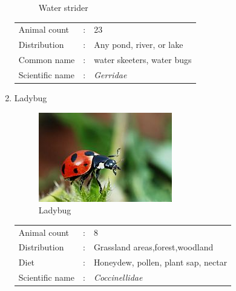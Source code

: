 \documentclass[a4paper, 12pt]{article}
\begin{document}
\begin{enumerate}
\begin{figure}[H]
\caption{Water strider}
\end{figure}
\begin{tabular}{lcl}
Animal count     &:& 23\\
Distribution     &:& Any pond, river, or lake\\
Common name      &:& water skeeters, water bugs\\
Scientific name  &:& \textit{Gerridae}
\end{tabular}

\item Ladybug\\
\begin{figure}[H]
\centering
\includegraphics[scale=4]{Image/220px-Coccinella_magnifica01.jpg}
\caption{Ladybug}
\end{figure}
\begin{tabular}{lcl}
Animal count     &:& 8\\
Distribution     &:& Grassland areas,forest,woodland\\
Diet             &:& Honeydew, pollen, plant sap, nectar\\
Scientific name  &:& \textit{Coccinellidae}
\end{tabular}


\end{enumerate}
\end{document}
